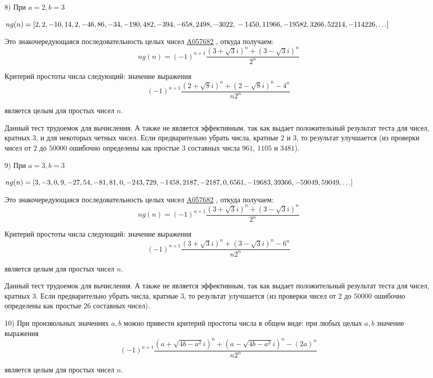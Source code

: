 \documentclass[
russian,
cp1251,
14pt,
simple
]{eskdtext}
\theoremstyle{definition}
\begin{document}
\begin{itemize}
\item[8)] При $a=2, b=3$

\begin{math}
ng(n)=[2,2,-10,14,2,-46,86,-34,-190,482,-394,-658,2498,-3022,\\
-1450,11966,-19582,3266,52214,-114226,\ldots]
\end{math}

Это знакочередующаяся последовательность целых чисел \href{http://oeis.org/A057682}{A057682} \cite{oeis}, откуда получаем:
$$
ng(n)=(-1)^{n+1}\frac{(3+\sqrt{3} i)^{n}+(3-\sqrt{3} i)^{n}}{2^{n}}
$$

Критерий простоты числа следующий: значение выражения
$$
(-1)^{n+1}\frac{(2+\sqrt{8} i)^{n}+(2-\sqrt{8} i)^{n}-4^{n}}{n 2^{n}}
$$

является целым для простых чисел $n$.

Данный тест трудоемок для вычисления. А также не является эффективным, так как выдает положительный результат теста для чисел, кратных 3, и для некоторых четных чисел. Если предварительно убрать числа, кратные 2 и 3, то результат улучшается (из проверки чисел от $2$ до $50000$ ошибочно определены как простые $3$ составных числа $961$, $1105$ и $3481$).

\item[9)] При $a=3, b=3$

\begin{math}
ng(n)=[3,-3,0,9,-27,54,-81,81,0,-243,729,-1458,2187,-2187,0,\\
6561,-19683,39366,-59049,59049,\ldots]
\end{math}

Это знакочередующаяся последовательность целых чисел \href{http://oeis.org/A057682}{A057682} \cite{oeis}, откуда получаем:
$$
ng(n)=(-1)^{n+1}\frac{(3+\sqrt{3} i)^{n}+(3-\sqrt{3} i)^{n}}{2^{n}}
$$

Критерий простоты числа следующий: значение выражения
$$
(-1)^{n+1}\frac{(3+\sqrt{3} i)^{n}+(3-\sqrt{3} i)^{n}-6^{n}}{n 2^{n}}
$$

является целым для простых чисел $n$.

Данный тест трудоемок для вычисления. А также не является эффективным, так как выдает положительный результат теста для чисел, кратных 3. Если предварительно убрать числа, кратные 3, то результат улучшается (из проверки чисел от $2$ до $50000$ ошибочно определены как простые $26$ составных чисел).

\item[10)] При произвольных значениях $a, b$ можно привести критерий простоты числа в общем виде: при любых целых $a, b$ значение выражения
$$
(-1)^{n+1}\frac{(a+\sqrt{4b-a^2} i)^{n}+(a-\sqrt{4b-a^2} i)^{n}-(2a)^{n}}{n 2^{n}}
$$

является целым для простых чисел $n$.

\end{itemize}
\end{document}
